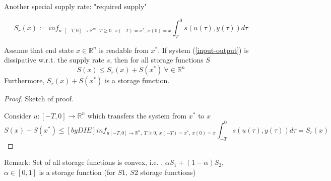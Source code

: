 Another special supply rate: "required supply"

\begin{equation*}
S_r(x) := inf_{u:[-T,0] \to \mathbb{R}^m, \ T \geq 0, \ x(-T) = x^*, \ x(0) = x} \int_T^0 s(u(\tau), y(\tau))d\tau
\end{equation*}

\begin{Theorem}
Assume that end state $x \in \mathbb{R}^n$ is readable from $x^*$. If system (\ref{input-output}) is dissipative w.r.t. the supply rate $s$, then for all storage functions $S$
\begin{equation*}
S(x) \leq S_r(x) + S(x^*) \ \forall \in \mathbb{R}^n
\end{equation*}
Furthermore, $S_r(x) + S(x^*)$ is a storage function.
\begin{proof}
Sketch of proof.

Consider $u:[-T,0] \to \mathbb{R}^n$ which transfers the system from $x^*$ to $x$
\begin{equation*}
S(x) - S(x^*) \leq[by DIE] inf_{u[-T,0] \to \mathbb{R}^n, \ T \geq 0, \ x(-T) = x^*, \ x(0) = x} \int_{-T}^0 s(u(\tau), y(\tau))d\tau = S_r(x)
\end{equation*}
\end{proof}
\end{Theorem}

Remark: Set of all storage functions is convex, i.e. , $\alpha S_1 + (1-\alpha) S_2$, $\alpha\in [0,1]$ is a storage function (for $S1, \ S2$ storage functions)